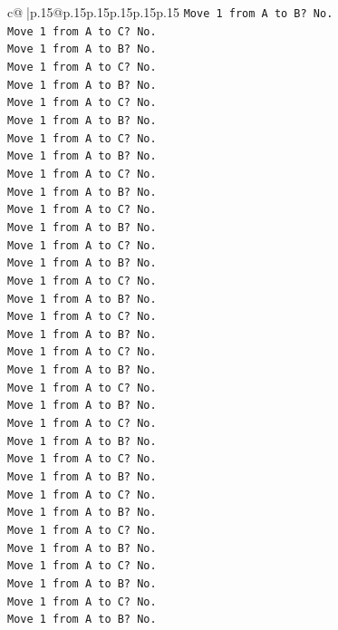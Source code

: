 \documentclass{article}
\begin{document}
{\begin{supertabular}{c@{$\;$}|p{.15\linewidth}@{}p{.15\linewidth}p{.15\linewidth}p{.15\linewidth}p{.15\linewidth}p{.15\linewidth}}
{{{\texttt{Move 1 from A to B? No.} \\
\texttt{Move 1 from A to C? No.} \\
\texttt{Move 1 from A to B? No.} \\
\texttt{Move 1 from A to C? No.} \\
\texttt{Move 1 from A to B? No.} \\
\texttt{Move 1 from A to C? No.} \\
\texttt{Move 1 from A to B? No.} \\
\texttt{Move 1 from A to C? No.} \\
\texttt{Move 1 from A to B? No.} \\
\texttt{Move 1 from A to C? No.} \\
\texttt{Move 1 from A to B? No.} \\
\texttt{Move 1 from A to C? No.} \\
\texttt{Move 1 from A to B? No.} \\
\texttt{Move 1 from A to C? No.} \\
\texttt{Move 1 from A to B? No.} \\
\texttt{Move 1 from A to C? No.} \\
\texttt{Move 1 from A to B? No.} \\
\texttt{Move 1 from A to C? No.} \\
\texttt{Move 1 from A to B? No.} \\
\texttt{Move 1 from A to C? No.} \\
\texttt{Move 1 from A to B? No.} \\
\texttt{Move 1 from A to C? No.} \\
\texttt{Move 1 from A to B? No.} \\
\texttt{Move 1 from A to C? No.} \\
\texttt{Move 1 from A to B? No.} \\
\texttt{Move 1 from A to C? No.} \\
\texttt{Move 1 from A to B? No.} \\
\texttt{Move 1 from A to C? No.} \\
\texttt{Move 1 from A to B? No.} \\
\texttt{Move 1 from A to C? No.} \\
\texttt{Move 1 from A to B? No.} \\
\texttt{Move 1 from A to C? No.} \\
\texttt{Move 1 from A to B? No.} \\
\texttt{Move 1 from A to C? No.} \\
\texttt{Move 1 from A to B? No.} \\
}}}
\end{supertabular}}
\end{document}
